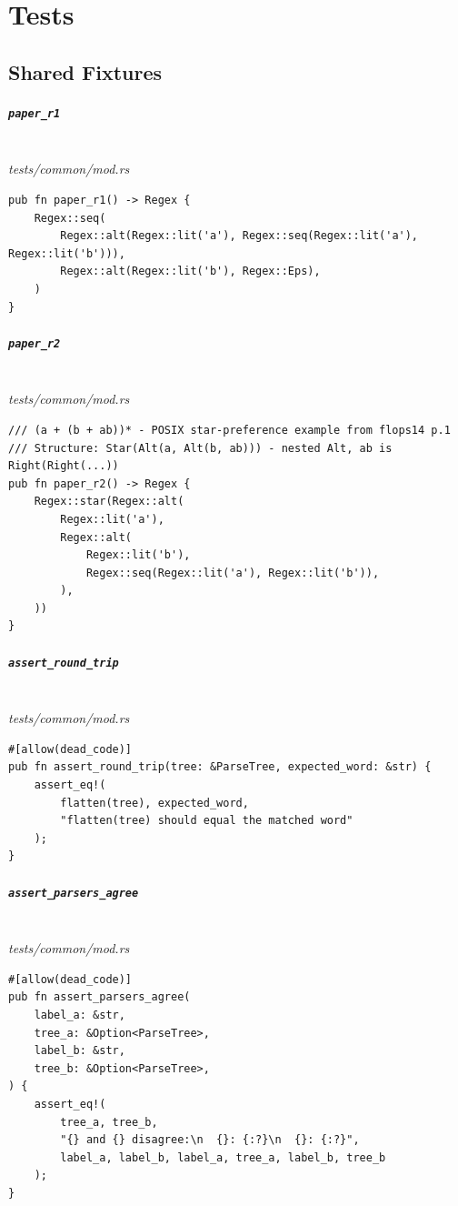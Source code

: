 \chapter{Tests}
\label{app:test-case-catalogue}

\section{Shared Fixtures}
\label{app:tests-fixtures}

\paragraph{\texttt{paper\_r1}}\ \\[-0.4em]
\textit{\small tests/common/mod.rs}
{\scriptsize\begin{verbatim}
pub fn paper_r1() -> Regex {
    Regex::seq(
        Regex::alt(Regex::lit('a'), Regex::seq(Regex::lit('a'), Regex::lit('b'))),
        Regex::alt(Regex::lit('b'), Regex::Eps),
    )
}
\end{verbatim}}

\paragraph{\texttt{paper\_r2}}\ \\[-0.4em]
\textit{\small tests/common/mod.rs}
{\scriptsize\begin{verbatim}
/// (a + (b + ab))* - POSIX star-preference example from flops14 p.1
/// Structure: Star(Alt(a, Alt(b, ab))) - nested Alt, ab is Right(Right(...))
pub fn paper_r2() -> Regex {
    Regex::star(Regex::alt(
        Regex::lit('a'),
        Regex::alt(
            Regex::lit('b'),
            Regex::seq(Regex::lit('a'), Regex::lit('b')),
        ),
    ))
}
\end{verbatim}}

\paragraph{\texttt{assert\_round\_trip}}\ \\[-0.4em]
\textit{\small tests/common/mod.rs}
{\scriptsize\begin{verbatim}
#[allow(dead_code)]
pub fn assert_round_trip(tree: &ParseTree, expected_word: &str) {
    assert_eq!(
        flatten(tree), expected_word,
        "flatten(tree) should equal the matched word"
    );
}
\end{verbatim}}

\paragraph{\texttt{assert\_parsers\_agree}}\ \\[-0.4em]
\textit{\small tests/common/mod.rs}
{\scriptsize\begin{verbatim}
#[allow(dead_code)]
pub fn assert_parsers_agree(
    label_a: &str,
    tree_a: &Option<ParseTree>,
    label_b: &str,
    tree_b: &Option<ParseTree>,
) {
    assert_eq!(
        tree_a, tree_b,
        "{} and {} disagree:\n  {}: {:?}\n  {}: {:?}",
        label_a, label_b, label_a, tree_a, label_b, tree_b
    );
}
\end{verbatim}}

